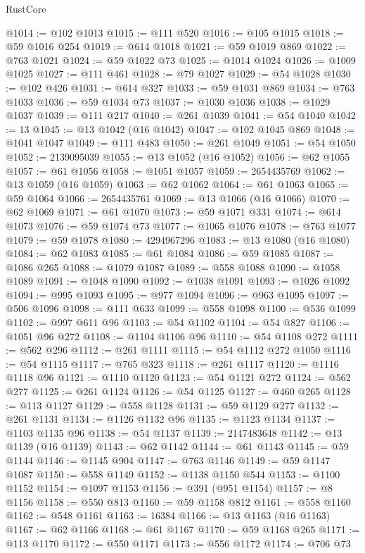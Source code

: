 \begin{lexlean}{RustCore}
\begin{coremodule}
@1014 := @102 @1013
@1015 := @111 @520
@1016 := @105 @1015
@1018 := @59 @1016 @254
@1019 := @614 @1018
@1021 := @59 @1019 @869
@1022 := @763 @1021
@1024 := @59 @1022 @73
@1025 := @1014 @1024
@1026 := @1009 @1025
@1027 := @111 @461
@1028 := @79 @1027
@1029 := @54 @1028
@1030 := @102 @426
@1031 := @614 @327
@1033 := @59 @1031 @869
@1034 := @763 @1033
@1036 := @59 @1034 @73
@1037 := @1030 @1036
@1038 := @1029 @1037
@1039 := @111 @217
@1040 := @261 @1039
@1041 := @54 @1040
@1042 := 13
@1045 := @13 @1042 (@16 @1042)
@1047 := @102 @1045 @869
@1048 := @1041 @1047
@1049 := @111 @483
@1050 := @261 @1049
@1051 := @54 @1050
@1052 := 2139095039
@1055 := @13 @1052 (@16 @1052)
@1056 := @62 @1055
@1057 := @61 @1056
@1058 := @1051 @1057
@1059 := 2654435769
@1062 := @13 @1059 (@16 @1059)
@1063 := @62 @1062
@1064 := @61 @1063
@1065 := @59 @1064
@1066 := 2654435761
@1069 := @13 @1066 (@16 @1066)
@1070 := @62 @1069
@1071 := @61 @1070
@1073 := @59 @1071 @331
@1074 := @614 @1073
@1076 := @59 @1074 @73
@1077 := @1065 @1076
@1078 := @763 @1077
@1079 := @59 @1078
@1080 := 4294967296
@1083 := @13 @1080 (@16 @1080)
@1084 := @62 @1083
@1085 := @61 @1084
@1086 := @59 @1085
@1087 := @1086 @265
@1088 := @1079 @1087
@1089 := @558 @1088
@1090 := @1058 @1089
@1091 := @1048 @1090
@1092 := @1038 @1091
@1093 := @1026 @1092
@1094 := @995 @1093
@1095 := @977 @1094
@1096 := @963 @1095
@1097 := @506 @1096
@1098 := @111 @633
@1099 := @558 @1098
@1100 := @536 @1099
@1102 := @997 @611 @96
@1103 := @54 @1102
@1104 := @54 @827
@1106 := @1051 @96 @272
@1108 := @1104 @1106 @96
@1110 := @54 @1108 @272
@1111 := @562 @296
@1112 := @261 @1111
@1115 := @54 @1112 @272 @1050
@1116 := @54 @1115
@1117 := @765 @323
@1118 := @261 @1117
@1120 := @1116 @1118 @96
@1121 := @1110 @1120
@1123 := @54 @1121 @272
@1124 := @562 @277
@1125 := @261 @1124
@1126 := @54 @1125
@1127 := @460 @265
@1128 := @113 @1127
@1129 := @558 @1128
@1131 := @59 @1129 @277
@1132 := @261 @1131
@1134 := @1126 @1132 @96
@1135 := @1123 @1134
@1137 := @1103 @1135 @96
@1138 := @54 @1137
@1139 := 2147483648
@1142 := @13 @1139 (@16 @1139)
@1143 := @62 @1142
@1144 := @61 @1143
@1145 := @59 @1144
@1146 := @1145 @904
@1147 := @763 @1146
@1149 := @59 @1147 @1087
@1150 := @558 @1149
@1152 := @1138 @1150 @544
@1153 := @1100 @1152
@1154 := @1097 @1153
@1156 := @391 (@951 @1154)
@1157 := @8 @1156
@1158 := @550 @813
@1160 := @59 @1158 @812
@1161 := @558 @1160
@1162 := @548 @1161
@1163 := 16384
@1166 := @13 @1163 (@16 @1163)
@1167 := @62 @1166
@1168 := @61 @1167
@1170 := @59 @1168 @265
@1171 := @113 @1170
@1172 := @550 @1171
@1173 := @556 @1172
@1174 := @706 @73

\end{coremodule}
\end{lexlean}

